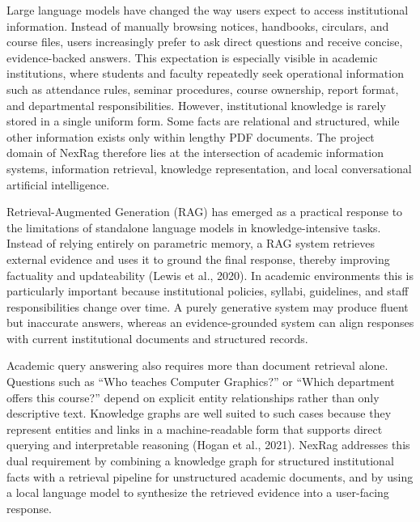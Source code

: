\newpage
{}
\label{chap:introduction}

\label{sec:introduction-overview}

\fontsize{12}{14}\selectfont

Large language models have changed the way users expect to access institutional information. Instead of manually browsing notices, handbooks, circulars, and course files, users increasingly prefer to ask direct questions and receive concise, evidence-backed answers. This expectation is especially visible in academic institutions, where students and faculty repeatedly seek operational information such as attendance rules, seminar procedures, course ownership, report format, and departmental responsibilities. However, institutional knowledge is rarely stored in a single uniform form. Some facts are relational and structured, while other information exists only within lengthy PDF documents. The project domain of NexRag therefore lies at the intersection of academic information systems, information retrieval, knowledge representation, and local conversational artificial intelligence.

Retrieval-Augmented Generation (RAG) has emerged as a practical response to the limitations of standalone language models in knowledge-intensive tasks. Instead of relying entirely on parametric memory, a RAG system retrieves external evidence and uses it to ground the final response, thereby improving factuality and updateability (Lewis et al., 2020). In academic environments this is particularly important because institutional policies, syllabi, guidelines, and staff responsibilities change over time. A purely generative system may produce fluent but inaccurate answers, whereas an evidence-grounded system can align responses with current institutional documents and structured records.

Academic query answering also requires more than document retrieval alone. Questions such as ``Who teaches Computer Graphics?'' or ``Which department offers this course?'' depend on explicit entity relationships rather than only descriptive text. Knowledge graphs are well suited to such cases because they represent entities and links in a machine-readable form that supports direct querying and interpretable reasoning (Hogan et al., 2021). NexRag addresses this dual requirement by combining a knowledge graph for structured institutional facts with a retrieval pipeline for unstructured academic documents, and by using a local language model to synthesize the retrieved evidence into a user-facing response.

